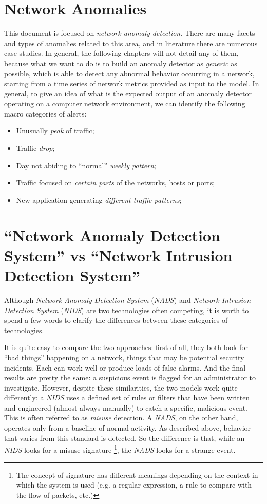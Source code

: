 \documentclass[12pt,a4paper,cucitura]{toptesi}
\begin{document}
\section{Network Anomalies}

This document is focused on \emph{network anomaly detection}.
There are many facets and types of anomalies related to this area, and in literature there are numerous case studies.
In general, the following chapters will not detail any of them, because what we want to do is to build an anomaly detector as \emph{generic} as possible, which is able to detect any abnormal behavior occurring in a network, starting from a time series of network metrics provided as input to the model.
In general, to give an idea of what is the expected output of an anomaly detector operating on a computer network environment, we can identify the following macro categories of alerts:

\begin{itemize}
\item Unusually \emph{peak} of traffic;
\item Traffic \emph{drop};
\item Day not abiding to ``normal'' \emph{weekly pattern};
\item Traffic focused on \emph{certain parts} of the networks, hosts or ports;
\item New application generating \emph{different traffic patterns};
\end{itemize}

\section{``Network Anomaly Detection System'' vs ``Network Intrusion Detection System''}
Although \emph{Network Anomaly Detection System} (\emph{NADS}) and \emph{Network Intrusion Detection System} (\emph{NIDS}) are two technologies often competing, it is worth to spend a few words to clarify the differences between these categories of technologies.

It is quite easy to compare the two approaches: first of all, they both look for ``bad things'' happening on a network, things that may be potential security incidents.
Each can work well or produce loads of false alarms.
And the final results are pretty the same: a suspicious event is flagged for an administrator to investigate.
However, despite these similarities, the two models work quite differently: a \emph{NIDS} uses a defined set of rules or filters that have been written and engineered (almost always manually) to catch a specific, malicious event.
This is often referred to as \emph{misuse} detection.
A \emph{NADS}, on the other hand, operates only from a baseline of normal activity.
As described above, behavior that varies from this standard is detected.
So the difference is that, while an \emph{NIDS} looks for a misuse signature \footnote{The concept of signature has different meanings depending on the context in which the system is used (e.g. a regular expression, a rule to compare with the flow of packets, etc.)}, the \emph{NADS} looks for a strange event.
\end{document}
